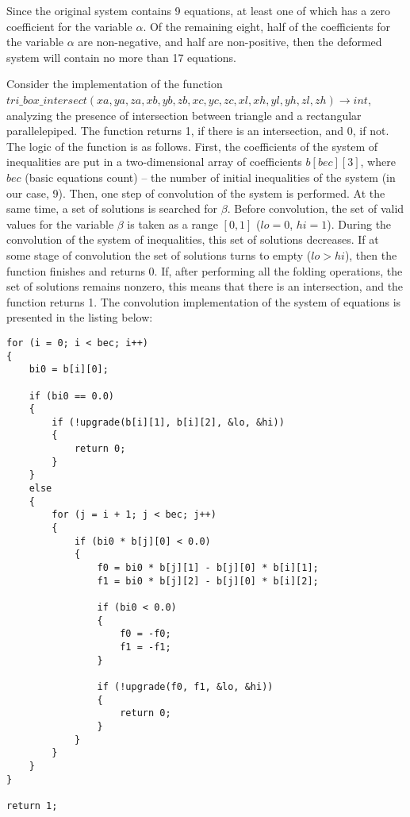 \documentclass[
11pt,%
tightenlines,%
twoside,%
onecolumn,%
nofloats,%
nobibnotes,%
nofootinbib,%
superscriptaddress,%
noshowpacs,%
centertags]%
{revtex4}
\begin{document}
Since the original system contains 9 equations, at least one of which has a zero coefficient for the variable $\alpha$.
Of the remaining eight, half of the coefficients for the variable $\alpha$ are non-negative, and half are non-positive, then the deformed system will contain no more than 17 equations.

Consider the implementation of the function \\
$tri\_box\_intersect(xa, ya, za, xb, yb, zb, xc, yc, zc, xl, xh, yl, yh, zl, zh) \rightarrow int$, analyzing the presence of intersection between triangle and a rectangular parallelepiped.
The function returns 1, if there is an intersection, and 0, if not.
The logic of the function is as follows.
First, the coefficients of the system of inequalities are put in a two-dimensional array of coefficients $b[bec][3]$, where $bec$ (basic equations count) -- the number of initial inequalities of the system (in our case, 9).
Then, one step of convolution of the system is performed. At the same time, a set of solutions is searched for $\beta$.
Before convolution, the set of valid values for the variable $\beta$ is taken as a range $[0, 1]$ ($lo = 0$, $hi = 1$).
During the convolution of the system of inequalities, this set of solutions decreases.
If at some stage of convolution the set of solutions turns to empty ($lo>hi$), then the function finishes and returns 0.
If, after performing all the folding operations, the set of solutions remains nonzero, this means that there is an intersection, and the function returns 1.
The convolution implementation of the system of equations is presented in the listing below:

\begin{lstlisting}[caption={The initial implementation of convolution of system of linear inequalities aimed to determine the intersection of a triangle and a rectangular parallelepiped.},label={lst:prac_intersect_1}]
for (i = 0; i < bec; i++)
{
    bi0 = b[i][0];

    if (bi0 == 0.0)
    {
        if (!upgrade(b[i][1], b[i][2], &lo, &hi))
        {
            return 0;
        }
    }
    else
    {
        for (j = i + 1; j < bec; j++)
        {
            if (bi0 * b[j][0] < 0.0)
            {
                f0 = bi0 * b[j][1] - b[j][0] * b[i][1];
                f1 = bi0 * b[j][2] - b[j][0] * b[i][2];

                if (bi0 < 0.0)
                {
                    f0 = -f0;
                    f1 = -f1;
                }

                if (!upgrade(f0, f1, &lo, &hi))
                {
                    return 0;
                }
            }
        }
    }
}

return 1;
\end{lstlisting}
\end{document}
